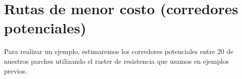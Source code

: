 \documentclass[
]{book}
\newenvironment{Shaded}{\begin{snugshade}}{\end{snugshade}}
\newcommand{\CommentTok}[1]{\textcolor[rgb]{0.56,0.35,0.01}{\textit{#1}}}
\newcommand{\DecValTok}[1]{\textcolor[rgb]{0.00,0.00,0.81}{#1}}
\newcommand{\FunctionTok}[1]{\textcolor[rgb]{0.13,0.29,0.53}{\textbf{#1}}}
\newcommand{\NormalTok}[1]{#1}
\newcommand{\OtherTok}[1]{\textcolor[rgb]{0.56,0.35,0.01}{#1}}
\newcommand{\SpecialCharTok}[1]{\textcolor[rgb]{0.81,0.36,0.00}{\textbf{#1}}}
\begin{document}
\section{Rutas de menor costo (corredores potenciales)}\label{rutas-de-menor-costo-corredores-potenciales}

Para realizar un ejemplo, estimaremos los corredores potenciales entre 20 de nuestros parches utilizando el raster de resistencia que usamos en ejemplos previos.

\begin{Shaded}
\end{Shaded}
\end{document}
